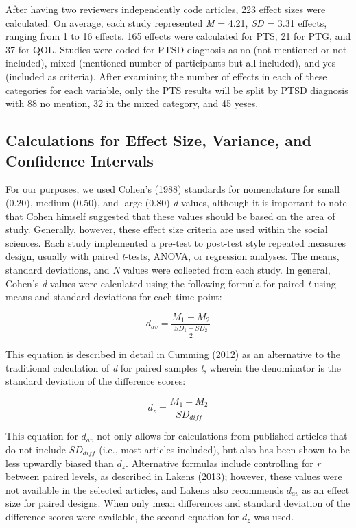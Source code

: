 \documentclass[,man]{apa6}
\begin{document}
After having two reviewers independently code articles, 223 effect sizes were calculated. On average, each study represented \emph{M} = 4.21, \emph{SD} = 3.31 effects, ranging from 1 to 16 effects. 165 effects were calculated for PTS, 21 for PTG, and 37 for QOL. Studies were coded for PTSD diagnosis as no (not mentioned or not included), mixed (mentioned number of participants but all included), and yes (included as criteria). After examining the number of effects in each of these categories for each variable, only the PTS results will be split by PTSD diagnosis with 88 no mention, 32 in the mixed category, and 45 yeses.

\hypertarget{calculations-for-effect-size-variance-and-confidence-intervals}{%
\subsection{Calculations for Effect Size, Variance, and Confidence Intervals}\label{calculations-for-effect-size-variance-and-confidence-intervals}}

For our purposes, we used Cohen's (1988) standards for nomenclature for small (0.20), medium (0.50), and large (0.80) \emph{d} values, although it is important to note that Cohen himself suggested that these values should be based on the area of study. Generally, however, these effect size criteria are used within the social sciences. Each study implemented a pre-test to post-test style repeated measures design, usually with paired \emph{t}-tests, ANOVA, or regression analyses. The means, standard deviations, and \emph{N} values were collected from each study. In general, Cohen's \emph{d} values were calculated using the following formula for paired \emph{t} using means and standard deviations for each time point:

\[
{d_{av}} = \frac { M_1 - M_2 } { \frac { SD_1 + SD_2 } { 2 }}
\]

This equation is described in detail in Cumming (2012) as an alternative to the traditional calculation of \emph{d} for paired samples \emph{t}, wherein the denominator is the standard deviation of the difference scores:

\[
{d_{z}} = \frac { M_1 - M_2 } { SD_{diff} }
\]

This equation for \(d_{av}\) not only allows for calculations from published articles that do not include \(SD_{diff}\) (i.e., most articles included), but also has been shown to be less upwardly biased than \(d_{z}\). Alternative formulas include controlling for \emph{r} between paired levels, as described in Lakens (2013); however, these values were not available in the selected articles, and Lakens also recommends \(d_{av}\) as an effect size for paired designs. When only mean differences and standard deviation of the difference scores were available, the second equation for \(d_z\) was used.
\end{document}
